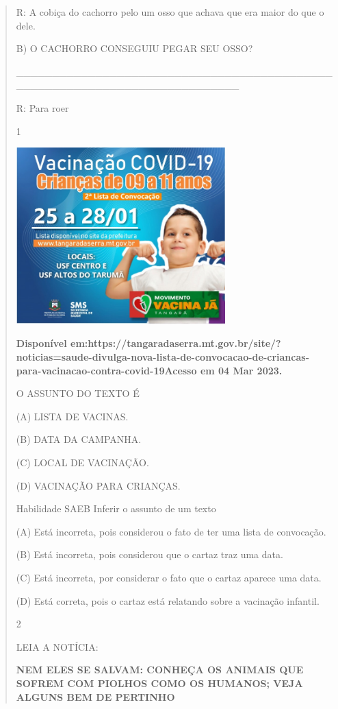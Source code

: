 {{{{\begin{verse}
{{\begin{escolha}
{{{{R: A cobiça do cachorro pelo um osso que achava que era maior do que o
dele.

B) O CACHORRO CONSEGUIU PEGAR SEU OSSO?

\_\_\_\_\_\_\_\_\_\_\_\_\_\_\_\_\_\_\_\_\_\_\_\_\_\_\_\_\_\_\_\_\_\_\_\_\_\_\_\_\_\_\_\_\_\_\_\_\_\_\_\_\_\_\_\_\_\_\_\_\_\_\_\_\_\_\_\_\_\_\_\_\_\_\_

R: Para roer


\num{1}

\includegraphics[width=3.17910in,height=2.68418in]{media/image124.jpeg}

\textbf{Disponível
em:https://tangaradaserra.mt.gov.br/site/?noticias=saude-divulga-nova-lista-de-convocacao-de-criancas-para-vacinacao-contra-covid-19Acesso
em 04 Mar 2023.}

O ASSUNTO DO TEXTO É

(A) LISTA DE VACINAS.

(B) DATA DA CAMPANHA.

(C) LOCAL DE VACINAÇÃO.

(D) VACINAÇÃO PARA CRIANÇAS.

Habilidade SAEB Inferir o assunto de um texto

(A) Está incorreta, pois considerou o fato de ter uma lista de
convocação.

(B) Está incorreta, pois considerou que o cartaz traz uma data.

(C) Está incorreta, por considerar o fato que o cartaz aparece uma data.

(D) Está correta, pois o cartaz está relatando sobre a vacinação
infantil.

\num{2}

LEIA A NOTÍCIA:

\textbf{NEM ELES SE SALVAM: CONHEÇA OS ANIMAIS QUE SOFREM COM PIOLHOS
COMO OS HUMANOS; VEJA ALGUNS BEM DE PERTINHO}

}}}}
\end{escolha}}}
\end{verse}}}}}
